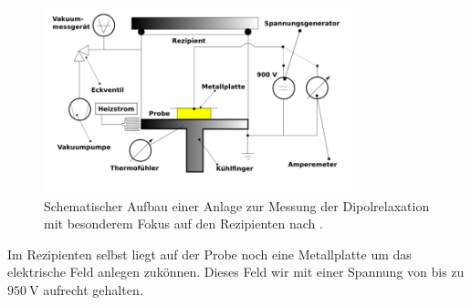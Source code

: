 \begin{figure}
    \centering
    \includegraphics[width=0.8\textwidth]{bilder/aufbau2.png}
    \caption{Schematischer Aufbau einer Anlage zur Messung der Dipolrelaxation mit 
            besonderem Fokus auf den Rezipienten nach 
            \cite{skript}.}
    \label{fig:aufbau2}
\end{figure}


Im Rezipienten selbst liegt auf der Probe noch eine Metallplatte um das elektrische Feld anlegen zukönnen.
Dieses Feld wir mit einer Spannung von bis zu $\SI{950}{\volt}$ aufrecht gehalten.
\\
\newline
